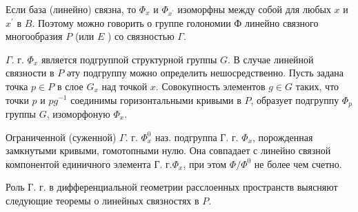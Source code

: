 \documentclass[10pt]{article}
\begin{document}
Если база (линейно) связна, то $\Phi_{x}$ и $\Phi_{x^{\prime}}$ изоморфны между собой для любых $x$ и $x^{\prime}$ в $B$. Поэтому можно говорить о группе голономии Ф линейно связного многообразия $P$ (или $E$ ) со связностью $\Gamma$.



$\Gamma$. г. $\Phi_{x}$ является подгруппой структурной группы $G$. В случае линейной связности в $P$ әту подгруппу можно определить нешосредственно. Пусть задана точка $p \in P$ в слое $G_{x}$ над точкой $x$. Совокупность элементов $g \in G$ таких, что точки $p$ и $p g^{-1}$ соединимы горизонтальными кривыми в $P$, образует подгруппу $\Phi_{p}$ группы $G$, изоморфоную $\Phi_{x}$.



Ограниченной (суженной) $\Gamma$. г. $\Phi_{x}^{0}$ наз. подгруппа Г. г. $\Phi_{x}$, порожденная замкнутыми кривыми, гомотопными нулю. Она совпадает с линейно связной компонентой единичного элемента $Г$. $г . \Phi_{x}$, при этом $\Phi / \Phi^{0}$ не более чем счетно.



Роль Г. г. в дифференциальной геометрии расслоенных пространств выясняют следующие теоремы о линейных связностях в $P$.
\end{document}
